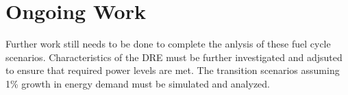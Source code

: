 \section{Ongoing Work}
Further work still needs to be done to complete the anlysis 
of these fuel cycle scenarios. Characteristics of the 
\gls{DRE} must be further investigated and adjsuted to 
ensure that required power levels are met. The transition 
scenarios assuming 1\% growth in energy demand must be 
simulated and analyzed. 